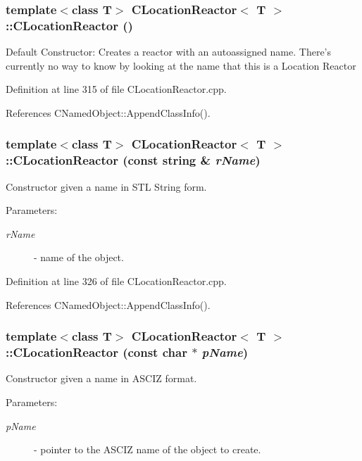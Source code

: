 \subsubsection{\setlength{\rightskip}{0pt plus 5cm}template$<$class T$>$ CLocation\-Reactor$<$ T $>$::CLocation\-Reactor ()}\label{classCLocationReactor_a0}


Default Constructor: Creates a reactor with an autoassigned name. There's currently no way to know by looking at the name that this is a Location Reactor 

Definition at line 315 of file CLocation\-Reactor.cpp.

References CNamed\-Object::Append\-Class\-Info().
\subsubsection{\setlength{\rightskip}{0pt plus 5cm}template$<$class T$>$ CLocation\-Reactor$<$ T $>$::CLocation\-Reactor (const string \& {\em r\-Name})}\label{classCLocationReactor_a1}


Constructor given a name in STL String form. \begin{Desc}
\item[Parameters: ]\par
\begin{description}
\item[{\em 
r\-Name}]- name of the object. \end{description}
\end{Desc}


Definition at line 326 of file CLocation\-Reactor.cpp.

References CNamed\-Object::Append\-Class\-Info().
\subsubsection{\setlength{\rightskip}{0pt plus 5cm}template$<$class T$>$ CLocation\-Reactor$<$ T $>$::CLocation\-Reactor (const char $\ast$ {\em p\-Name})}\label{classCLocationReactor_a2}


Constructor given a name in ASCIZ format. \begin{Desc}
\item[Parameters: ]\par
\begin{description}
\item[{\em 
p\-Name}]- pointer to the ASCIZ name of the object to create. \end{description}
\end{Desc}


